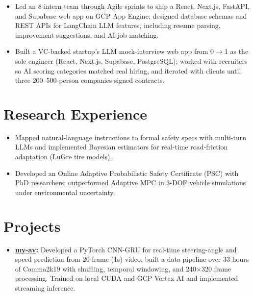 \documentclass[11pt, letterpaper]{article}
\begin{document}
\vspace{1pt}
\begin{itemize}
  \item Led an 8-intern team through Agile sprints to ship a React, Next.js, FastAPI, and Supabase web app on GCP App Engine; designed database schemas and REST APIs for LangChain LLM features, including resume parsing, improvement suggestions, and AI job matching.
\end{itemize}

\vspace{1pt}
\begin{itemize}
  \item Built a VC-backed startup's LLM mock-interview web app from 0$\to$1 as the sole engineer (React, Next.js, Supabase, PostgreSQL); worked with recruiters so AI scoring categories matched real hiring, and iterated with clients until three 200--500-person companies signed contracts.
\end{itemize}

\section{Research Experience}
\begin{itemize}
  \item Mapped natural-language instructions to formal safety specs with multi-turn LLMs and implemented Bayesian estimators for real-time road-friction adaptation (LuGre tire models).
  \item Developed an Online Adaptive Probabilistic Safety Certificate (PSC) with PhD researchers; outperformed Adaptive MPC in 3-DOF vehicle simulations under environmental uncertainty.
\end{itemize}

\section{Projects}
\begin{itemize}
  \item \textbf{\href{https://github.com/lordphone/my-av}{my-av}:} Developed a PyTorch CNN-GRU for real-time steering-angle and speed prediction from 20-frame (1s) video; built a data pipeline over 33 hours of Comma2k19 with shuffling, temporal windowing, and 240$\times$320 frame processing. Trained on local CUDA and GCP Vertex AI and implemented streaming inference.
\end{itemize}
\end{document}
